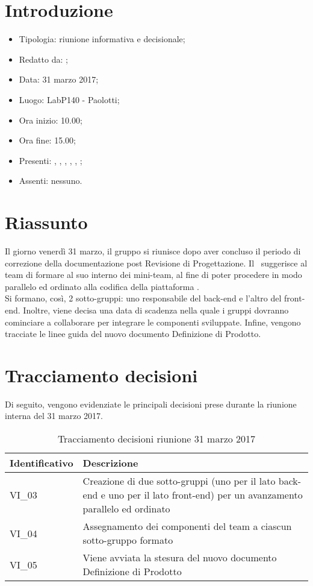 \section{Introduzione}

	\begin{itemize}
		\item Tipologia: riunione informativa e decisionale;
		\item Redatto da: \NS;
		\item Data: 31 marzo 2017;
		\item Luogo: LabP140 - Paolotti;
		\item Ora inizio: 10.00;
		\item Ora fine: 15.00;
		\item Presenti: \AS, \DS, \MC, \AN, \NS, \DAN;	
		\item Assenti: nessuno.
	\end{itemize}

\section{Riassunto}
Il giorno venerdì 31 marzo, il gruppo si riunisce dopo aver concluso il periodo di correzione della documentazione post Revisione di Progettazione. Il \RdP\ suggerisce al team di formare al suo interno dei mini-team, al fine di poter procedere in modo parallelo ed ordinato alla codifica della piattaforma \progetto.\\
Si formano, così, 2 sotto-gruppi: uno responsabile del back-end e l'altro del front-end. Inoltre, viene decisa una data di scadenza nella quale i gruppi dovranno cominciare a collaborare per integrare le componenti sviluppate.
Infine, vengono tracciate le linee guida del nuovo documento Definizione di Prodotto.

\section{Tracciamento decisioni}
Di seguito, vengono evidenziate le principali decisioni prese durante la riunione interna del 31 marzo 2017.

\begin{table}[H]
	\begin{center}
		\begin{tabular}{|p{3cm}| p{11cm}|}
			\hline
			\textbf{Identificativo}	& \textbf{Descrizione} \\
			\hline
			VI\_03	& Creazione di due sotto-gruppi (uno per il lato back-end e uno per il lato front-end) per un avanzamento parallelo ed ordinato	\\
			\hline
			VI\_04 & Assegnamento dei componenti del team a ciascun sotto-gruppo formato \\
			\hline
			VI\_05 & Viene avviata la stesura del nuovo documento Definizione di Prodotto \\
			\hline
		\end{tabular}
		\caption{Tracciamento decisioni riunione 31 marzo 2017}
	\end{center}
\end{table}